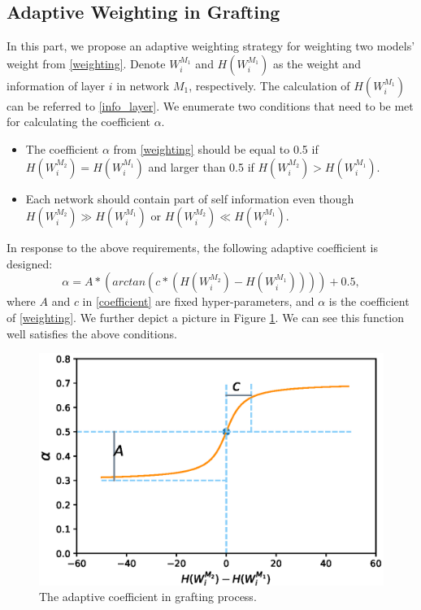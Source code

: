 \documentclass{article}
\begin{document}
\subsection{Adaptive Weighting in Grafting}\label{sec_3_3}
In this part, we propose an adaptive weighting strategy for weighting two models' weight from \eqref{weighting}.  Denote $W_{i}^{M_{1}}$ and $H(W_{i}^{M_{1}})$ as the weight and information of layer $i$  in network $M_{1}$, respectively. The calculation of $H(W_{i}^{M_{1}})$ can be referred to \eqref{info_layer}. We enumerate two conditions that need to be met for calculating the coefficient $\alpha$.
\begin{itemize}
	\item The coefficient $\alpha$ from \eqref{weighting} should be equal to 0.5 if $H(W_{i}^{M_{2}}) = H(W_{i}^{M_{1}})$ and 
	larger than 0.5 if $H(W_{i}^{M_{2}}) > H(W_{i}^{M_{1}})$.
	\item Each network should contain part of self information even though $H(W_{i}^{M_{2}}) \gg H(W_{i}^{M_{1}})$ or $H(W_{i}^{M_{2}}) \ll H(W_{i}^{M_{1}})$.
\end{itemize}
In response to the above requirements, the following adaptive coefficient is designed: 
\begin{equation}\label{coefficient}
	\alpha=A\ast(arctan(c\ast(H(W_{i}^{M_{2}})-H(W_{i}^{M_{1}}))))+0.5,
\end{equation}
where $A$ and $c$ in \eqref{coefficient} are fixed hyper-parameters, and $\alpha$ is the coefficient of \eqref{weighting}. We further depict a picture in 
Figure \ref{figure: adaptive_w}. We can see this function well satisfies the above conditions.
\begin{figure}[!h]
	\centering
	\includegraphics[width=15cm,]{fig/adaptive_w.eps}
	\caption{The adaptive coefficient in grafting process.}
	\label{figure: adaptive_w}
\end{figure}
\end{document}
